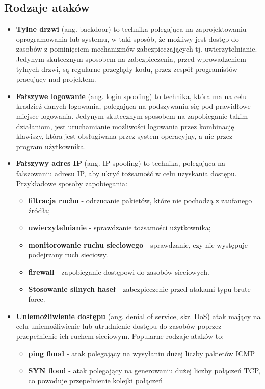 \documentclass{article}
\begin{document}
\subsection{Rodzaje ataków}
\begin{itemize}
    \item \textbf{Tylne drzwi} (ang. backdoor) to technika polegająca na zaprojektowaniu oprogramowania lub systemu, w taki sposób, że możliwy jest dostęp do zasobów z pominięciem mechanizmów zabezpieczających tj. uwierzytelnianie. Jedynym skutecznym sposobem na zabezpieczenia, przed wprowadzeniem tylnych drzwi, są regularne przeglądy kodu, przez zespół programistów pracujący nad projektem.
    \item \textbf{Fałszywe logowanie} (ang. login spoofing) to technika, która ma na celu kradzież danych logowania, polegająca na podszywaniu się pod prawidłowe miejsce logowania. Jedynym skutecznym sposobem na zapobieganie takim działaniom, jest uruchamianie możliwości logowania przez kombinację klawiszy, która jest obsługiwana przez system operacyjny, a nie przez program użytkownika. 
    \item \textbf{Fałszywy adres IP} (ang. IP spoofing) to technika, polegająca na fałszowaniu adresu IP, aby ukryć tożsamość w celu uzyskania dostępu. Przykładowe sposoby zapobiegania:
\begin{itemize}
    \item \textbf{filtracja ruchu} - odrzucanie pakietów, które nie pochodzą z zaufanego źródła;
    \item \textbf{uwierzytelnianie} - sprawdzanie tożsamości użytkownika;
    \item \textbf{monitorowanie ruchu sieciowego} - sprawdzanie, czy nie występuje podejrzany ruch sieciowy.
    \item \textbf{firewall} - zapobieganie dostępowi do zasobów sieciowych.
    \item \textbf{Stosowanie silnych haseł} - zabezpieczenie przed atakami typu brute force.
\end{itemize}
    \item \textbf{Uniemożliwienie dostępu} (ang. denial of service, skr. DoS) atak mający na celu uniemożliwienie lub utrudnienie dostępu do zasobów poprzez przepełnienie ich ruchem sieciowym.
Popularne rodzaje ataków to:
\begin{itemize}
    \item \textbf{ping flood} - atak polegający na wysyłaniu dużej liczby pakietów ICMP
    \item \textbf{SYN flood} - atak polegający na generowaniu dużej liczby połączeń TCP, co powoduje przepełnienie kolejki połączeń

\end{itemize}
\end{itemize}
\end{document}
